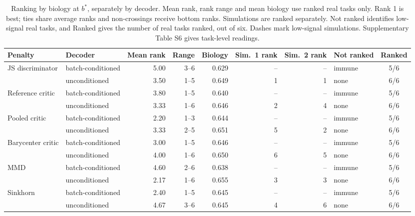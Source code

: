 \begin{table}[t]
\centering\scriptsize\renewcommand{\tablename}{Supplementary Table}\renewcommand{\thetable}{S12}%
\caption{Ranking by biology at $b^*$, separately by decoder. Mean rank, rank range and mean biology use ranked real tasks only. Rank 1 is best; ties share average ranks and non-crossings receive bottom ranks. Simulations are ranked separately. Not ranked identifies low-signal real tasks, and Ranked gives the number of real tasks ranked, out of six. Dashes mark low-signal simulations. Supplementary Table S6 gives task-level readings.}
\label{tab:3}
\setlength{\tabcolsep}{3pt}
\begin{tabular}{@{}llrrrrrlc@{}}
\toprule
Penalty & Decoder & Mean rank & Range & Biology & Sim.\ 1 rank & Sim.\ 2 rank & Not ranked & Ranked \\
\midrule
JS discriminator & batch-conditioned & 5.00 & 3--6 & 0.629 & -- & -- & immune & 5/6 \\
                  & unconditioned & 3.50 & 1--5 & 0.649 & 1 & 1 & none & 6/6 \\
Reference critic & batch-conditioned & 3.80 & 1--5 & 0.640 & -- & -- & immune & 5/6 \\
                  & unconditioned & 3.33 & 1--6 & 0.646 & 2 & 4 & none & 6/6 \\
Pooled critic & batch-conditioned & 2.20 & 1--3 & 0.644 & -- & -- & immune & 5/6 \\
                  & unconditioned & 3.33 & 2--5 & 0.651 & 5 & 2 & none & 6/6 \\
Barycenter critic & batch-conditioned & 3.00 & 1--5 & 0.646 & -- & -- & immune & 5/6 \\
                  & unconditioned & 4.00 & 1--6 & 0.650 & 6 & 5 & none & 6/6 \\
MMD & batch-conditioned & 4.60 & 2--6 & 0.638 & -- & -- & immune & 5/6 \\
                  & unconditioned & 2.17 & 1--6 & 0.655 & 3 & 3 & none & 6/6 \\
Sinkhorn & batch-conditioned & 2.40 & 1--5 & 0.645 & -- & -- & immune & 5/6 \\
                  & unconditioned & 4.67 & 3--6 & 0.645 & 4 & 6 & none & 6/6 \\
\bottomrule
\end{tabular}
\end{table}
